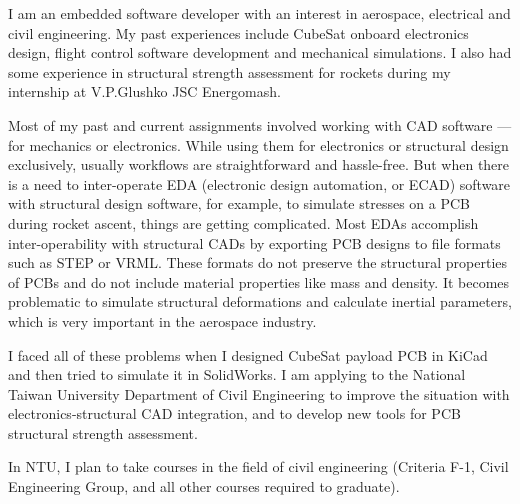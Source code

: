 \documentclass[letter,11pt]{article}
\begin{document}
    \begin{justify}
        I am an embedded software developer with an interest in aerospace, electrical and civil engineering. My past experiences include CubeSat onboard electronics design, flight control software development and mechanical simulations. I also had some experience in structural strength assessment for rockets during my internship at V.P.Glushko JSC Energomash.
        
        \setlength{\parskip}{1em}
        \setlength{\parindent}{0em}
        Most of my past and current assignments involved working with CAD software --- for mechanics or electronics. While using them for electronics or structural design exclusively, usually workflows are straightforward and hassle-free. But when there is a need to inter-operate EDA (electronic design automation, or ECAD) software with structural design software, for example, to simulate stresses on a PCB during rocket ascent, things are getting complicated. Most EDAs accomplish inter-operability with structural CADs by exporting PCB designs to file formats such as STEP or VRML. These formats do not preserve the structural properties of PCBs and do not include material properties like mass and density. It becomes problematic to simulate structural deformations and calculate inertial parameters, which is very important in the aerospace industry. 

        I faced all of these problems when I designed CubeSat payload PCB in KiCad and then tried to simulate it in SolidWorks. I am applying to the National Taiwan University Department of Civil Engineering to improve the situation with electronics-structural CAD integration, and to develop new tools for PCB structural strength assessment.
   
        In NTU, I plan to take courses in the field of civil engineering (Criteria F-1, Civil Engineering Group, and all other courses required to graduate).
    \end{justify}
\end{document}
